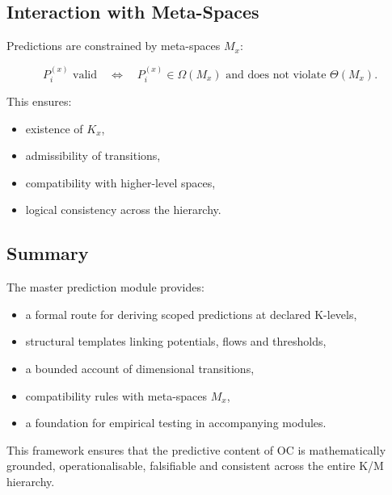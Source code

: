 \subsection{Interaction with Meta-Spaces}

Predictions are constrained by meta-spaces $M_x$:

\[
P^{(x)}_i \text{ valid}
\quad\Leftrightarrow\quad
P^{(x)}_i \in \Omega(M_x) \text{ and does not violate } \Theta(M_x).
\]

This ensures:

\begin{itemize}
    \item existence of $K_x$,
    \item admissibility of transitions,
    \item compatibility with higher-level spaces,
    \item logical consistency across the hierarchy.
\end{itemize}

\subsection{Summary}

The master prediction module provides:

\begin{itemize}
    \item a formal route for deriving scoped predictions at declared K-levels,
    \item structural templates linking potentials, flows and thresholds,
    \item a bounded account of dimensional transitions,
    \item compatibility rules with meta-spaces $M_x$,
    \item a foundation for empirical testing in accompanying modules.
\end{itemize}

This framework ensures that the predictive content of OC  
is mathematically grounded, operationalisable, falsifiable  
and consistent across the entire K/M hierarchy.
